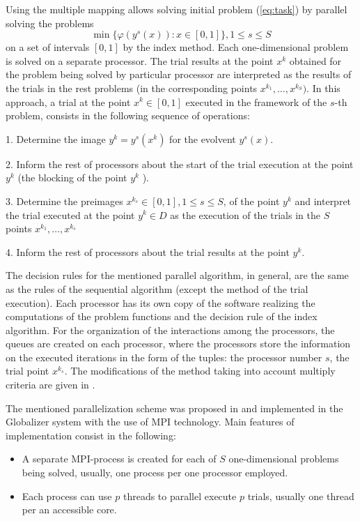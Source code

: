 \documentclass{svproc}
\begin{document}
Using the multiple mapping allows solving initial problem (\ref{eq:task}) by parallel solving the
problems
\[
\min\{\varphi(y^s(x)):x\in [0,1]\}, 1\leqslant s\leqslant S
\]
on a set of intervals $[0,1]$ by the index method. Each one-dimensional problem is solved on a
separate processor. The trial results at the point \(x^k\) obtained for the problem being solved by
particular processor are interpreted as the results of the trials in the rest problems (in the
corresponding points \(x^{k_1},\dots,x^{k_S})\). In this approach, a trial at the point \(x^k \in
[0,1]\) executed in the framework of the \(s\)-th problem, consists in the following sequence of
operations:
\par
1. Determine the image \(y^k=y^s (x^k)\) for the evolvent \(y^s (x)\).
\par
2. Inform the rest of processors about the start of the trial execution at the point \( y^k\) (the
blocking of the point \(y^k\) ).
\par
3. Determine the preimages \(x{}^{k_s}  \in [0,1], 1\leqslant s\leqslant S\), of the point \(y^k\) and interpret the
trial executed at the point \(y^k \in D \) as the execution of the trials in the \(S\) points
\(x{}^{k_1} ,\dots,x{}^{k_s} \)
\par
4. Inform the rest of processors about the trial results at the point \(y^k\).
\par
The decision rules for the mentioned parallel algorithm, in general, are the same as the rules of the
sequential algorithm (except the method of the trial execution). Each processor has its own copy
of the software realizing the computations of the problem functions and the decision rule of the
index algorithm. For the organization of the interactions among the processors, the queues are
created on each processor, where the processors store the information on the executed iterations
in the form of the tuples: the processor number \(s\), the trial point \(x{}^{k_s}\).
The modifications of the method taking into account multiply criteria are given in \cite{GERGEL2017,Gergel2018}.
\par
The mentioned parallelization scheme was proposed in \cite{Gergel2009} and implemented in the Globalizer system with the use of MPI technology. Main
features of implementation consist in the following:
\begin{itemize}
  \item A separate MPI-process is created for each
 of \(S\) one-dimensional problems being solved, usually, one process per one processor
 employed.
 \item Each process can use $p$ threads to parallel execute $p$ trials, usually one thread per an accessible core.
\end{itemize}
\end{document}
